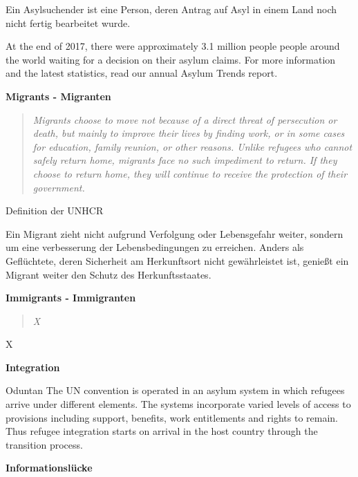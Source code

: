 Ein Asylsuchender ist eine Person, deren Antrag auf Asyl in einem Land noch nicht fertig bearbeitet wurde.

At the end of 2017, there were approximately 3.1 million people people around the world waiting for a decision on their asylum claims. For more information and the latest statistics, read our annual Asylum Trends report.

\textbf{Migrants - Migranten}

\begin{quote}
    \textit{Migrants choose to move not because of a direct threat of persecution or death, but mainly to improve their lives by finding work, or in some cases for education, family reunion, or other reasons. Unlike refugees who cannot safely return home, migrants face no such impediment to return. If they choose to return home, they will continue to receive the protection of their government.}\cite{unhcr2016migrant}
\end{quote}
\caption{Definition der UNHCR}

Ein Migrant zieht nicht aufgrund Verfolgung oder Lebensgefahr weiter, sondern um eine verbesserung der Lebensbedingungen zu erreichen. Anders als Geflüchtete, deren Sicherheit am Herkunftsort nicht gewährleistet ist, genießt ein Migrant weiter den Schutz des Herkunftsstaates.


\textbf{Immigrants - Immigranten}

\begin{quote}
    \textit{X}
\end{quote}
\caption{X}  

\textbf{Integration}


Oduntan
The UN convention is operated in an asylum system in
which refugees arrive under different elements. The
systems incorporate varied levels of access to provisions
including support, benefits, work entitlements and rights to
remain. Thus refugee integration starts on arrival in the host
country through the transition process.


\textbf{Informationslücke}

